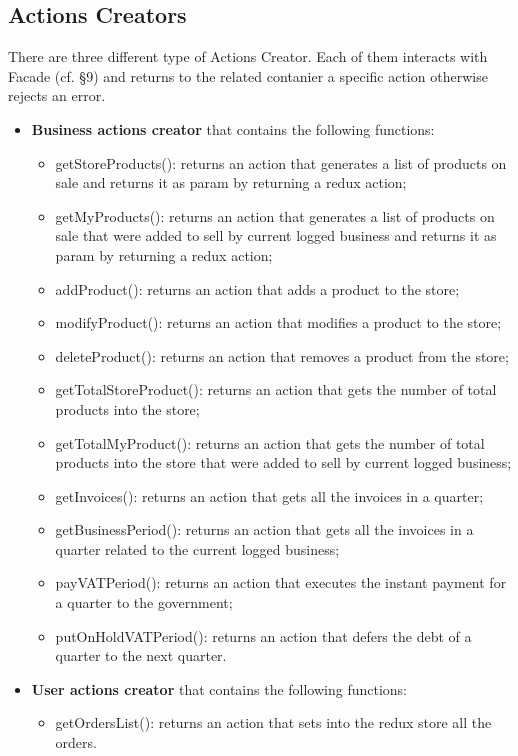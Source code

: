 \subsection{Actions Creators}
There are three different type of Actions Creator. Each of them interacts with Facade (cf. §9) and returns to the related contanier a specific action otherwise rejects an error.
\begin{itemize}
	\item \textbf{Business actions creator} that contains the following functions: 
	\begin{itemize}
		\item getStoreProducts(): returns an action that generates a list of products on sale and returns it as param by returning a redux action;
		\item getMyProducts():
		returns an action that generates a list of products on sale that were added to sell by current logged business and returns it as param by returning a redux action;
		\item addProduct():
		returns an action that adds a product to the store;
		\item modifyProduct():
		returns an action that modifies a product to the store;
		\item deleteProduct():
		returns an action that removes a product from the store;
		\item getTotalStoreProduct():
		returns an action that gets the number of total products into the store;
		\item getTotalMyProduct():
		returns an action that gets the number of total products into the store that were added to sell by current logged business;
		\item getInvoices(): returns an action that gets all the invoices in a quarter;
		\item getBusinessPeriod():
		returns an action that gets all the invoices in a quarter related to the current logged business;
		\item payVATPeriod():
		returns an action that executes the instant payment for a quarter to the government;
		\item putOnHoldVATPeriod(): returns an action that defers the debt of a quarter to the next quarter.
	\end{itemize}
	\item \textbf{User actions creator} that contains the following functions:
	\begin{itemize}
		\item getOrdersList(): returns an action that sets into the redux store all the orders.

\end{itemize}
\end{itemize}
